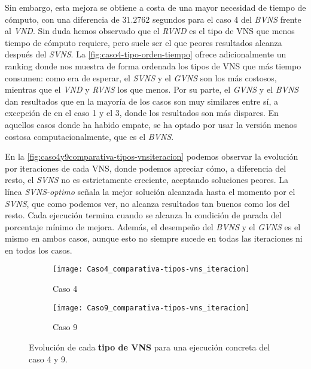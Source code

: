 Sin embargo, esta mejora se obtiene a costa de una mayor necesidad de tiempo de cómputo, con una diferencia de $31.2762$ segundos para el caso 4 del \textit{BVNS} frente al \textit{VND}. Sin duda hemos observado que el \textit{RVND} es el tipo de VNS que menos tiempo de cómputo requiere, pero suele ser el que peores resultados alcanza después del \textit{SVNS}. La \autoref{fig:caso4-tipo-orden-tiempo} ofrece adicionalmente un ranking donde nos muestra de forma ordenada los tipos de VNS que más tiempo consumen: como era de esperar, el \textit{SVNS} y el \textit{GVNS} son los más costosos, mientras que el \textit{VND} y \textit{RVNS} los que menos. Por su parte, el \textit{GVNS} y el \textit{BVNS} dan resultados que en la mayoría de los casos son muy similares entre sí, a excepción de en el caso 1 y el 3, donde los resultados son más dispares. En aquellos casos donde ha habido empate, se ha optado por usar la versión menos costosa computacionalmente, que es el \textit{BVNS}.

En la \autoref{fig:caso4y9comparativa-tipos-vnsiteracion} podemos observar la evolución por iteraciones de cada VNS, donde podemos apreciar cómo, a diferencia del resto, el \textit{SVNS} no es estrictamente creciente, aceptando soluciones peores. La línea \textit{SVNS-optimo} señala la mejor solución alcanzada hasta el momento por el \textit{SVNS}, que como podemos ver, no alcanza resultados tan buenos como los del resto. Cada ejecución termina cuando se alcanza la condición de parada del porcentaje mínimo de mejora. Además, el desempeño del \textit{BVNS} y el \textit{GVNS} es el mismo en ambos casos, aunque esto no siempre sucede en todas las iteraciones ni en todos los casos.

\begin{figure}
	\begin{subfigure}{\linewidth}
		\centering
		\texttt{[image: Caso4\_comparativa-tipos-vns\_iteracion]}
		\caption{Caso 4}
		\label{fig:caso4comparativa-tipos-vnsiteracion}
	\end{subfigure}

	\begin{subfigure}{\linewidth}
		\centering
		\texttt{[image: Caso9\_comparativa-tipos-vns\_iteracion]}
		\caption{Caso 9}
		\label{fig:caso9comparativa-tipos-vnsiteracion}
	\end{subfigure}
	\caption{Evolución de cada \textbf{tipo de VNS} para una ejecución concreta del caso 4 y 9.}
	\label{fig:caso4y9comparativa-tipos-vnsiteracion}
\end{figure}

